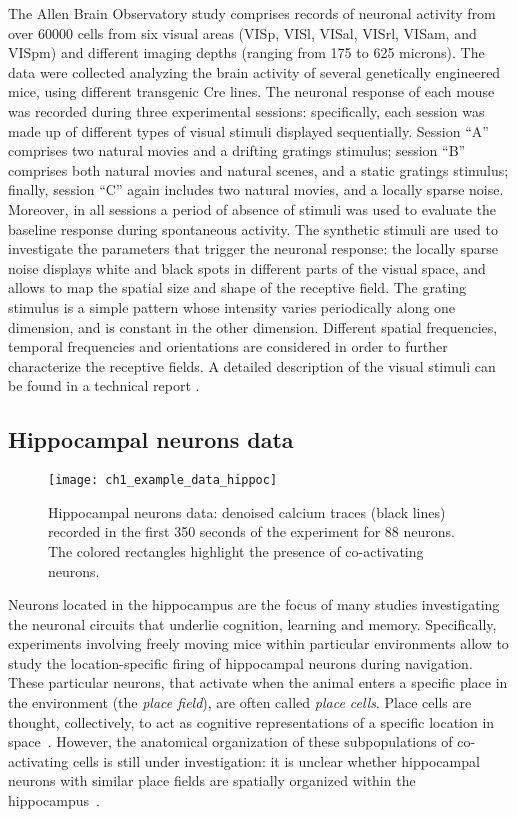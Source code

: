 The Allen Brain Observatory study comprises records of neuronal activity from over $60000$ cells from six visual areas (VISp, VISl, VISal, VISrl, VISam, and VISpm) and different imaging depths (ranging from 175 to 625 microns). The data were collected analyzing the brain activity of several genetically engineered mice, using different transgenic Cre lines.
The neuronal response of each mouse was recorded during three experimental sessions: specifically, each session was made up of different types of visual stimuli displayed sequentially.
Session ``A'' comprises two natural movies and a drifting gratings stimulus; session ``B'' comprises both natural movies and natural scenes, and a static gratings stimulus; finally, session ``C'' again includes two natural movies, and a locally sparse noise. Moreover, in all sessions a period of absence of stimuli was used to evaluate the baseline response during spontaneous activity.
The synthetic stimuli are used to investigate the parameters that trigger the neuronal response: the locally sparse noise displays white and black spots in different parts of the visual space, and allows to map the spatial size and shape of the receptive field. The grating stimulus is a simple pattern whose intensity varies periodically along one dimension, and is constant in the other dimension. Different spatial frequencies, temporal frequencies and orientations are considered in order to further characterize the receptive fields. A detailed description of the visual stimuli can be found in a technical report \parencite{allen_stimulus}.





\subsection{Hippocampal neurons data}
\begin{figure}
	\centering
	\texttt{[image: ch1\_example\_data\_hippoc]}
	\caption[Calcium traces of 88 neurons from the hippocampal neurons data.]{Hippocampal neurons data: denoised calcium traces (black lines) recorded in the first 350 seconds of the experiment for 88 neurons. The colored rectangles highlight the presence of co-activating neurons.}\label{ch1_fig:data_hippoc}
\end{figure}

Neurons located in the hippocampus are the focus of many studies investigating the neuronal circuits that underlie cognition, learning and memory.
Specifically, experiments involving freely moving mice within particular environments allow to study the location-specific firing of hippocampal neurons during navigation. These particular neurons, that activate when the animal enters a specific place in the environment (the \textit{place field}), are often called \textit{place cells}. Place cells are thought, collectively, to act as cognitive representations of a specific location in space~\parencite{okeefe1978}. However, the anatomical organization of these subpopulations of co-activating cells is still under investigation: it is unclear whether hippocampal neurons with similar place fields are spatially organized within the hippocampus~\parencite{dombeck2010}.

